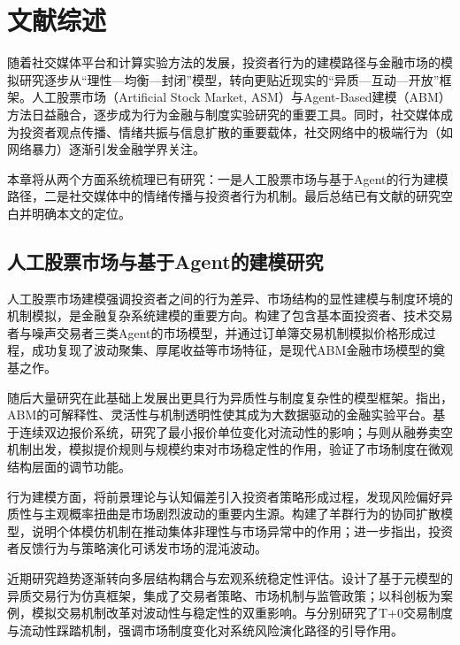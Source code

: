 \chapter{文献综述}

随着社交媒体平台和计算实验方法的发展，投资者行为的建模路径与金融市场的模拟研究逐步从“理性—均衡—封闭”模型，转向更贴近现实的“异质—互动—开放”框架。人工股票市场（Artificial Stock Market, ASM）与Agent-Based建模（ABM）方法日益融合，逐步成为行为金融与制度实验研究的重要工具。同时，社交媒体成为投资者观点传播、情绪共振与信息扩散的重要载体，社交网络中的极端行为（如网络暴力）逐渐引发金融学界关注。

本章将从两个方面系统梳理已有研究：一是人工股票市场与基于Agent的行为建模路径，二是社交媒体中的情绪传播与投资者行为机制。最后总结已有文献的研究空白并明确本文的定位。

\section{人工股票市场与基于Agent的建模研究}

人工股票市场建模强调投资者之间的行为差异、市场结构的显性建模与制度环境的机制模拟，是金融复杂系统建模的重要方向。\textcite{chiarella2009impact}构建了包含基本面投资者、技术交易者与噪声交易者三类Agent的市场模型，并通过订单簿交易机制模拟价格形成过程，成功复现了波动聚集、厚尾收益等市场特征，是现代ABM金融市场模型的奠基之作。

随后大量研究在此基础上发展出更具行为异质性与制度复杂性的模型框架。\textcite{zhang2021financialengineering}指出，ABM的可解释性、灵活性与机制透明性使其成为大数据驱动的金融实验平台。\textcite{li2012tick}基于连续双边报价系统，研究了最小报价单位变化对流动性的影响；\textcite{zhou2023shortselling}与\textcite{xiong2020shortsellingsize}则从融券卖空机制出发，模拟提价规则与规模约束对市场稳定性的作用，验证了市场制度在微观结构层面的调节功能。

行为建模方面，\textcite{hu2022heterogeneous}将前景理论与认知偏差引入投资者策略形成过程，发现风险偏好异质性与主观概率扭曲是市场剧烈波动的重要内生源。\textcite{chen2020herding}构建了羊群行为的协同扩散模型，说明个体模仿机制在推动集体非理性与市场异常中的作用；\textcite{zou2021chaotic}进一步指出，投资者反馈行为与策略演化可诱发市场的混沌波动。

近期研究趋势逐渐转向多层结构耦合与宏观系统稳定性评估。\textcite{zhangyi2022micromodel}设计了基于元模型的异质交易行为仿真框架，集成了交易者策略、市场机制与监管政策；\textcite{liangrui2022starboard}以科创板为案例，模拟交易机制改革对波动性与稳定性的双重影响。\textcite{wei2023t0}与\textcite{wei2021liquiditycrisis}分别研究了T+0交易制度与流动性踩踏机制，强调市场制度变化对系统风险演化路径的引导作用。

